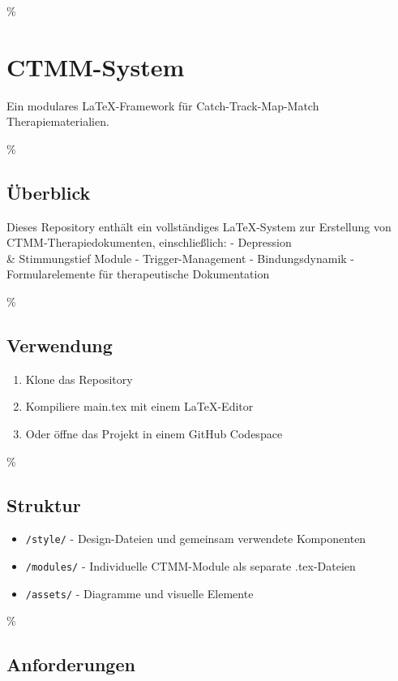 \hypertarget{ctmm-system}{\%
\section{CTMM-System}\label{ctmm-system}}

Ein modulares LaTeX-Framework für Catch-Track-Map-Match Therapiematerialien.

\hypertarget{uxfcberblick}{\%
\subsection{Überblick}\label{uxfcberblick}}

Dieses Repository enthält ein vollständiges LaTeX-System zur Erstellung von CTMM-Therapiedokumenten, einschließlich:
- Depression \\& Stimmungstief Module
- Trigger-Management
- Bindungsdynamik
- Formularelemente für therapeutische Dokumentation

\hypertarget{verwendung}{\%
\subsection{Verwendung}\label{verwendung}}

\begin{enumerate}
\def\labelenumi{\arabic{enumi}.}
\tightlist
\item
  Klone das Repository
\item
  Kompiliere main.tex mit einem LaTeX-Editor
\item
  Oder öffne das Projekt in einem GitHub Codespace
\end{enumerate}

\hypertarget{struktur}{\%
\subsection{Struktur}\label{struktur}}

\begin{itemize}
\tightlist
\item
  \texttt{/style/} - Design-Dateien und gemeinsam verwendete Komponenten
\item
  \texttt{/modules/} - Individuelle CTMM-Module als separate .tex-Dateien
\item
  \texttt{/assets/} - Diagramme und visuelle Elemente
\end{itemize}

\hypertarget{anforderungen}{\%
\subsection{Anforderungen}\label{anforderungen}}

